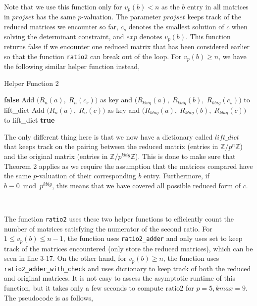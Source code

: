 \documentclass[letterpaper,12pt]{article}
\newcommand{\Z}{\mathbb{Z}}
\begin{document}
Note that we use this function only for $v_p(b) < n$
as the $b$ entry in all matrices in $projset$ has the same $p$-valuation.
The parameter $projset$ keeps track of the reduced matrices we encounter so far,
$c_s$ denotes the smallest solution of $c$ when solving the determinant constraint, and 
$exp$ denotes $v_p(b)$.
This function returns false if we encounter one reduced matrix 
that has been considered earlier so that the function \texttt{ratio2} can break out of the loop.
For $v_p(b) \geq n$, we have the following similar helper function instead,

\begin{algorithm}[H]
\caption{Helper Function 2}
\begin{algorithmic}[1]
            \State \Return \textbf{false}
        \EndIf
    \EndIf
    \State Add $\big( R_n(a),\; R_n(c_s) \big)$ as key and  $\big( R_{kbig}(a),\; R_{kbig}(b) ,\; R_{kbig}(c_s) \big)$ to lift\_dict
        \State Add $\big( R_n(a),\; R_n(c) \big)$ as key and  $\big( R_{kbig}(a),\; R_{kbig}(b) ,\; R_{kbig}(c) \big)$ to lift\_dict
    \EndFor
    \State \Return \textbf{true}
\EndFunction
\end{algorithmic}
\end{algorithm}

The only different thing here is that we now have a dictionary called
$lift\_dict$ that keeps track on the pairing between the reduced matrix
(entries in $\Z/p^n\Z$) and the original matrix (entries in $\Z/p^{kbig}\Z$).
This is done to make sure that Theorem 2 applies as 
we require the assumption that the matrices compared have the same $p$-valuation of their corresponding $b$ entry.
Furthermore, if $b \equiv 0 \bmod p^{kbig}$, this means that we have covered 
all possible reduced form of $c$.

\

The function \texttt{ratio2} uses these two helper functions to 
efficiently count the number of matrices satisfying the numerator of the second ratio.
For $1 \leq v_p(b) \leq n-1$, the function uses \texttt{ratio2\_adder}
and only uses set to keep track of the matrices encountered (only store the reduced matrices),
which can be seen in line 3-17.
On the other hand, for $v_p(b) \geq n$, the function uses 
\texttt{ratio2\_adder\_with\_check} and uses dictionary to keep track of 
both the reduced and original matrices.
It is not easy to assess the asymptotic runtime of this function, but it takes only a few seconds
to compute ratio2 for $p = 5, kmax = 9$.
The pseudocode is as follows, 
\end{document}
